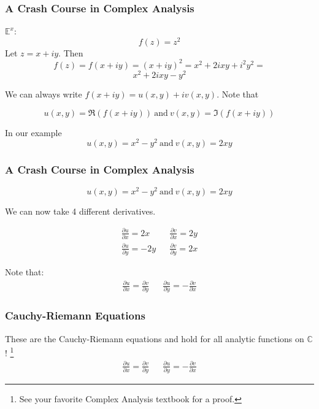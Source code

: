 \documentclass{beamer}
\def\C{\mathbb{C}}                     %
\begin{document}
\begin{frame}
\frametitle{A Crash Course in Complex Analysis}

$\mathbb{E}^x$:
\[ f(z) = z^2 \]
\pause
Let $z=x+iy$. Then
\[ f(z) = f(x+iy) = (x+iy)^2 = x^2 +2ixy + i^2y^2 = \]
\[ x^2+ 2ixy - y^2 \]

\pause
We can always write $f(x+iy) = u(x,y) + iv(x,y)$. Note that

\[ u(x,y) = \mathfrak{R}(f(x+iy)) \ \mathrm{and} \ v(x,y) = \mathfrak{I}(f(x+iy)) \]

\pause
In our example
\[ u(x,y) = x^2 - y^2 \ \mathrm{and} \ v(x,y) = 2xy \]

\end{frame}

\begin{frame}
\frametitle{A Crash Course in Complex Analysis}

\[ u(x,y) = x^2 - y^2 \ \mathrm{and} \ v(x,y) = 2xy \]

We can now take 4 different derivatives.

\begin{eqnarray*}
\frac{\partial u}{\partial x} = 2x && \frac{\partial v}{\partial x} = 2y \\
\frac{\partial u}{\partial y} = -2y && \frac{\partial v}{\partial y} = 2x
\end{eqnarray*}

\pause
  Note that:
  \begin{eqnarray*}
  \frac{\partial u}{\partial x} = \frac{\partial v}{\partial y} &&
  \frac{\partial u}{\partial y} = -\frac{\partial v}{\partial x}
  \end{eqnarray*}

\end{frame}

\begin{frame}
\frametitle{Cauchy-Riemann Equations}
  These are the Cauchy-Riemann equations and hold for all analytic functions on $\C$! \footnote{See your favorite Complex Analysis textbook for a proof.}
  \begin{eqnarray*}
  \frac{\partial u}{\partial x} = \frac{\partial v}{\partial y} &&
  \frac{\partial u}{\partial y} = -\frac{\partial v}{\partial x}
  \end{eqnarray*}



\end{frame}
\end{document}
